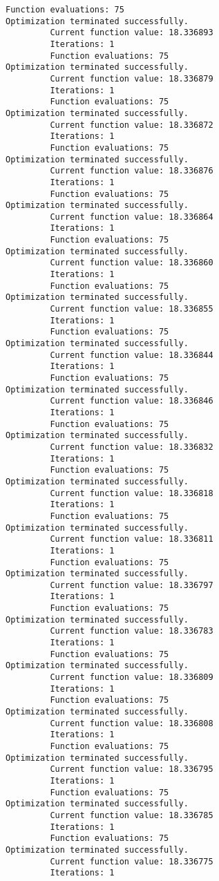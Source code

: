 \documentclass[11pt]{article}
\begin{document}
\begin{Verbatim}[commandchars=\\\{\}]
         Function evaluations: 75
Optimization terminated successfully.
         Current function value: 18.336893
         Iterations: 1
         Function evaluations: 75
Optimization terminated successfully.
         Current function value: 18.336879
         Iterations: 1
         Function evaluations: 75
Optimization terminated successfully.
         Current function value: 18.336872
         Iterations: 1
         Function evaluations: 75
Optimization terminated successfully.
         Current function value: 18.336876
         Iterations: 1
         Function evaluations: 75
Optimization terminated successfully.
         Current function value: 18.336864
         Iterations: 1
         Function evaluations: 75
Optimization terminated successfully.
         Current function value: 18.336860
         Iterations: 1
         Function evaluations: 75
Optimization terminated successfully.
         Current function value: 18.336855
         Iterations: 1
         Function evaluations: 75
Optimization terminated successfully.
         Current function value: 18.336844
         Iterations: 1
         Function evaluations: 75
Optimization terminated successfully.
         Current function value: 18.336846
         Iterations: 1
         Function evaluations: 75
Optimization terminated successfully.
         Current function value: 18.336832
         Iterations: 1
         Function evaluations: 75
Optimization terminated successfully.
         Current function value: 18.336818
         Iterations: 1
         Function evaluations: 75
Optimization terminated successfully.
         Current function value: 18.336811
         Iterations: 1
         Function evaluations: 75
Optimization terminated successfully.
         Current function value: 18.336797
         Iterations: 1
         Function evaluations: 75
Optimization terminated successfully.
         Current function value: 18.336783
         Iterations: 1
         Function evaluations: 75
Optimization terminated successfully.
         Current function value: 18.336809
         Iterations: 1
         Function evaluations: 75
Optimization terminated successfully.
         Current function value: 18.336808
         Iterations: 1
         Function evaluations: 75
Optimization terminated successfully.
         Current function value: 18.336795
         Iterations: 1
         Function evaluations: 75
Optimization terminated successfully.
         Current function value: 18.336785
         Iterations: 1
         Function evaluations: 75
Optimization terminated successfully.
         Current function value: 18.336775
         Iterations: 1

\end{Verbatim}
\end{document}
